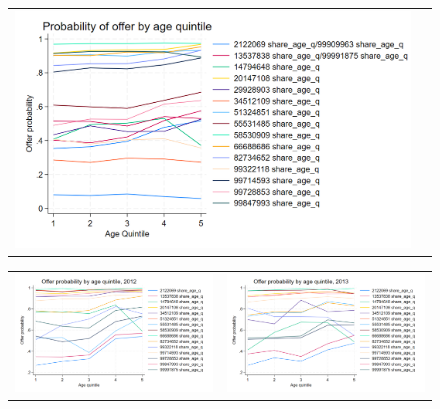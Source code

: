 \documentclass[12pt]{article}
\begin{document}
\begin{figure}[H] 
\caption{}
\label{fig:ie3_14}
\centering{}%
\begin{tabular}{cc}
\includegraphics[scale=0.27]{../figures/IE3_supply_offerprob_age_q.png}
\end{tabular}
\end{figure}




\begin{figure}[H] 
\caption{}
\label{fig:ie3_15}
\centering{}%
\begin{tabular}{cc}
\includegraphics[scale=0.27]{../figures/IE3_supply_offerprob_age_q_2012.png} &
\includegraphics[scale=0.27]{../figures/IE3_supply_offerprob_age_q_2013.png}
\end{tabular}
\end{figure}
\end{document}
